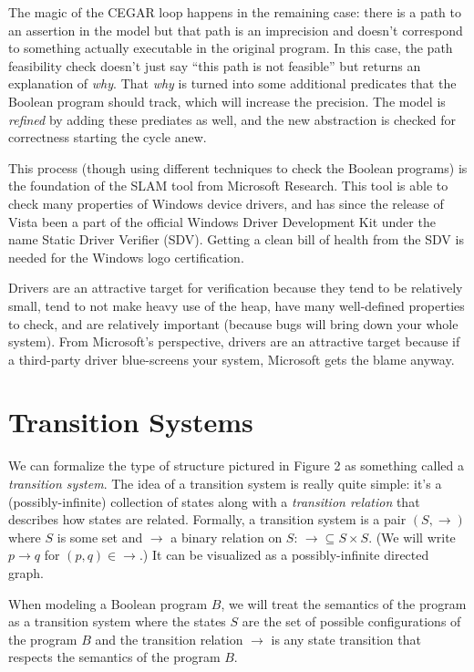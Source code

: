\documentclass{article}
\newenvironment{sidebar}{}{}
\begin{document}
\begin{sidebar}
The magic of the CEGAR loop happens in the remaining case: there is a
path to an assertion in the model but that path is an imprecision and
doesn't correspond to something actually executable in the original
program. In this case, the path feasibility check doesn't just say
``this path is not feasible'' but returns an explanation of
\emph{why}. That \emph{why} is turned into some additional predicates
that the Boolean program should track, which will increase the
precision. The model is \emph{refined} by adding these prediates as
well, and the new abstraction is checked for correctness starting the
cycle anew.

This process (though using different techniques to check the Boolean
programs) is the foundation of the SLAM tool from Microsoft
Research. This tool is able to check many properties of Windows device
drivers, and has since the release of Vista been a part of the
official Windows Driver Development Kit under the name Static Driver
Verifier (SDV). Getting a clean bill of health from the SDV is needed
for the Windows logo certification. 

Drivers are an attractive target for verification because they tend to
be relatively small, tend to not make heavy use of the heap, have many
well-defined properties to check, and are relatively important
(because bugs will bring down your whole system). From Microsoft's
perspective, drivers are an attractive target because if a third-party
driver blue-screens your system, Microsoft gets the blame anyway.
\end{sidebar}


\section{Transition Systems}
We can formalize the type of structure pictured in Figure 2 as
something called a \emph{transition system}. The idea of a transition
system is really quite simple: it's a (possibly-infinite) collection
of states along with a \emph{transition relation} that describes how
states are related. Formally, a transition system is a pair $(S,
\rightarrow)$ where $S$ is some set and $\rightarrow$ a binary
relation on $S$: $\rightarrow \subseteq S \times S$. (We will write $p
\rightarrow q$ for $(p, q) \in \rightarrow$.) It can be visualized as
a possibly-infinite directed graph.

When modeling a Boolean program $B$, we will treat the semantics of
the program as a transition system where the states $S$ are the set of
possible configurations of the program $B$ and the transition relation
$\rightarrow$ is any state transition that respects the semantics of
the program $B$.
\end{document}
